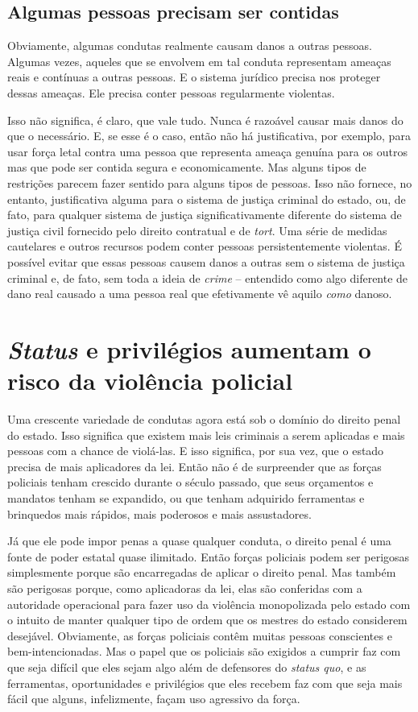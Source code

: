 \subsection*{Algumas pessoas precisam ser contidas}

Obviamente, algumas condutas realmente causam danos a outras pessoas. Algumas vezes, aqueles que se envolvem em tal conduta representam ameaças reais e contínuas a outras pessoas. E o sistema jurídico precisa nos proteger dessas ameaças. Ele precisa conter pessoas regularmente violentas.

Isso não significa, é claro, que vale tudo. Nunca é razoável causar mais danos do que o necessário. E, se esse é o caso, então não há justificativa, por exemplo, para usar força letal contra uma pessoa que representa ameaça genuína para os outros mas que pode ser contida segura e economicamente. Mas alguns tipos de restrições parecem fazer sentido para alguns tipos de pessoas. Isso não fornece, no entanto, justificativa alguma para o sistema de justiça criminal do estado, ou, de fato, para qualquer sistema de justiça significativamente diferente do sistema de justiça civil fornecido pelo direito contratual e de \emph{tort}. Uma série de medidas cautelares e outros recursos podem conter pessoas persistentemente violentas. É possível evitar que essas pessoas causem danos a outras sem o sistema de justiça criminal e, de fato, sem toda a ideia de \emph{crime} -- entendido como algo diferente de dano real causado a uma pessoa real que efetivamente vê aquilo \emph{como} danoso.

\section{\emph{Status} e privilégios aumentam o risco da violência policial}

Uma crescente variedade de condutas agora está sob o domínio do direito penal do estado. Isso significa que existem mais leis criminais a serem aplicadas e mais pessoas com a chance de violá-las. E isso significa, por sua vez, que o estado precisa de mais aplicadores da lei. Então não é de surpreender que as forças policiais tenham crescido durante o século passado, que seus orçamentos e mandatos tenham se expandido, ou que tenham adquirido ferramentas e brinquedos mais rápidos, mais poderosos e mais assustadores.

Já que ele pode impor penas a quase qualquer conduta, o direito penal é uma fonte de poder estatal quase ilimitado. Então forças policiais podem ser perigosas simplesmente porque são encarregadas de aplicar o direito penal. Mas também são perigosas porque, como aplicadoras da lei, elas são conferidas com a autoridade operacional para fazer uso da violência monopolizada pelo estado com o intuito de manter qualquer tipo de ordem que os mestres do estado considerem desejável. Obviamente, as forças policiais contêm muitas pessoas conscientes e bem-intencionadas. Mas o papel que os policiais são exigidos a cumprir faz com que seja difícil que eles sejam algo além de defensores do \emph{status quo}, e as ferramentas, oportunidades e privilégios que eles recebem faz com que seja mais fácil que alguns, infelizmente, façam uso agressivo da força.

